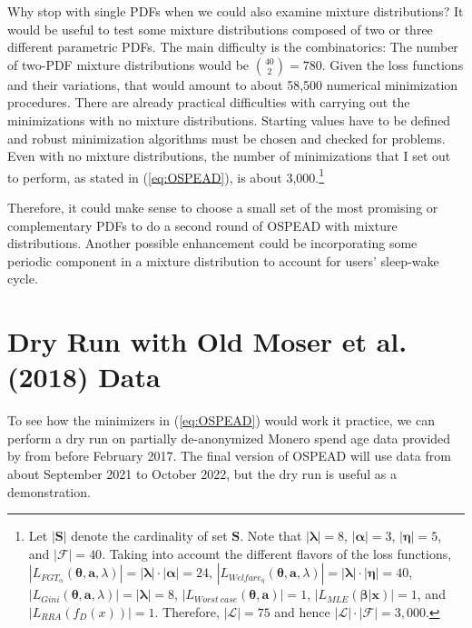 \documentclass[english]{article}
\begin{document}
Why stop with single PDFs when we could also examine mixture distributions?
It would be useful to test some mixture distributions composed of
two or three different parametric PDFs. The main difficulty is the
combinatorics: The number of two-PDF mixture distributions would be
$\binom{40}{2}=780$. Given the loss functions and their variations,
that would amount to about 58,500 numerical minimization procedures.
There are already practical difficulties with carrying out the minimizations
with no mixture distributions. Starting values have to be defined
and robust minimization algorithms must be chosen and checked for
problems. Even with no mixture distributions, the number of minimizations
that I set out to perform, as stated in (\ref{eq:OSPEAD}), is about
3,000.\footnote{Let $\left|\mathbf{S}\right|$ denote the cardinality of set $\mathbf{S}$.
Note that $\left|\boldsymbol{\lambda}\right|=8$, $\left|\boldsymbol{\alpha}\right|=3$,
$\left|\boldsymbol{\eta}\right|=5$, and $\left|\mathcal{F}\right|=40$.
Taking into account the different flavors of the loss functions, $\left|L_{FGT_{\alpha}}(\boldsymbol{\theta},\boldsymbol{a},\lambda)\right|=\left|\boldsymbol{\lambda}\right|\cdot\left|\boldsymbol{\alpha}\right|=24$,
$\left|L_{Welfare_{\eta}}(\boldsymbol{\theta},\boldsymbol{a},\lambda)\right|=\left|\boldsymbol{\lambda}\right|\cdot\left|\boldsymbol{\eta}\right|=40$,
$\left|L_{Gini}(\boldsymbol{\theta},\boldsymbol{a},\lambda)\right|=\left|\boldsymbol{\lambda}\right|=8$,
$\left|L_{Worst\:case}(\boldsymbol{\theta},\boldsymbol{a})\right|=1$,
$\left|L_{MLE}\left(\boldsymbol{\beta}|\mathbf{x}\right)\right|=1$,
and $\left|L_{RRA}\left(f_{D}(x)\right)\right|=1$. Therefore, $\left|\mathcal{L}\right|=75$
and hence $\left|\mathcal{L}\right|\cdot\left|\mathcal{F}\right|=3,000$.}

Therefore, it could make sense to choose a small set of the most promising
or complementary PDFs to do a second round of OSPEAD with mixture
distributions. Another possible enhancement could be incorporating
some periodic component in a mixture distribution to account for users'
sleep-wake cycle.

\section{Dry Run with Old M{\:o}ser et al. (2018) Data\label{sec:Dry-Run-with-Old-Moser-et-al-Data}}

To see how the minimizers in (\ref{eq:OSPEAD}) would work it practice,
we can perform a dry run on partially de-anonymized Monero spend age
data provided by \cite{2018} from before February 2017. The final
version of OSPEAD will use data from about September 2021 to October
2022, but the dry run is useful as a demonstration.
\end{document}
